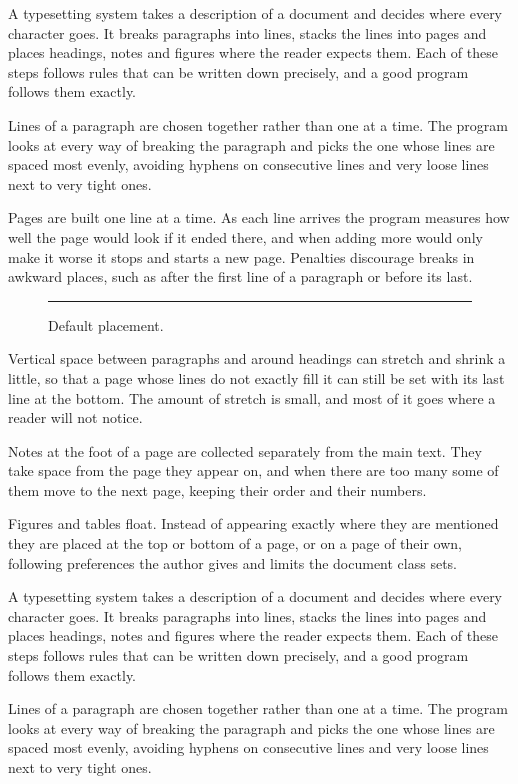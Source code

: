 \documentclass{article}
\begin{document}
A typesetting system takes a description of a document and decides where every character goes. It breaks paragraphs into lines, stacks the lines into pages and places headings, notes and figures where the reader expects them. Each of these steps follows rules that can be written down precisely, and a good program follows them exactly.

Lines of a paragraph are chosen together rather than one at a time. The program looks at every way of breaking the paragraph and picks the one whose lines are spaced most evenly, avoiding hyphens on consecutive lines and very loose lines next to very tight ones.

Pages are built one line at a time. As each line arrives the program measures how well the page would look if it ended there, and when adding more would only make it worse it stops and starts a new page. Penalties discourage breaks in awkward places, such as after the first line of a paragraph or before its last.
\begin{figure}
\centering
\rule{5cm}{3cm}
\caption{Default placement.}\label{fig:d}
\end{figure}
Vertical space between paragraphs and around headings can stretch and shrink a little, so that a page whose lines do not exactly fill it can still be set with its last line at the bottom. The amount of stretch is small, and most of it goes where a reader will not notice.

Notes at the foot of a page are collected separately from the main text. They take space from the page they appear on, and when there are too many some of them move to the next page, keeping their order and their numbers.

Figures and tables float. Instead of appearing exactly where they are mentioned they are placed at the top or bottom of a page, or on a page of their own, following preferences the author gives and limits the document class sets.

A typesetting system takes a description of a document and decides where every character goes. It breaks paragraphs into lines, stacks the lines into pages and places headings, notes and figures where the reader expects them. Each of these steps follows rules that can be written down precisely, and a good program follows them exactly.

Lines of a paragraph are chosen together rather than one at a time. The program looks at every way of breaking the paragraph and picks the one whose lines are spaced most evenly, avoiding hyphens on consecutive lines and very loose lines next to very tight ones.
\end{document}
